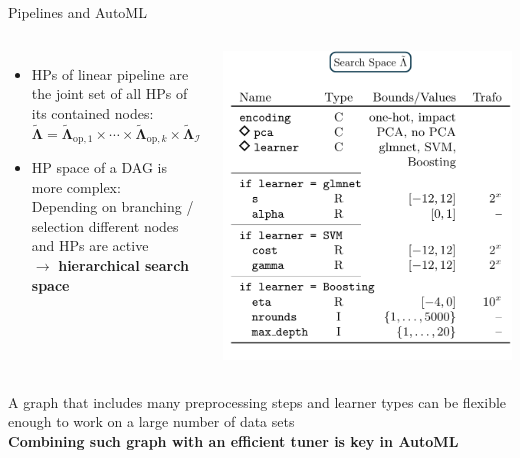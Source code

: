 \begin{vbframe}{Pipelines and AutoML}
\begin{columns}
\begin{itemize}
    \item HPs of linear pipeline are the joint set of all HPs of its contained nodes:\\
    $\tilde{\bm\Lambda}=\tilde{\bm\Lambda}_{\mathrm{op}, 1} \times \cdots \times \tilde{\bm\Lambda}_{\mathrm{op}, k} \times \tilde{\bm\Lambda}_{\mathcal{I}}$
    \item HP space of a DAG is more complex:\\
    Depending on branching / selection different nodes and HPs are active\\ $\rightarrow$ \textbf{hierarchical search space}
\end{itemize}
\begin{center}
\includegraphics[width = \textwidth]{figure_man/pipeline_with_param_table_II.png}
\end{center}
\end{columns}%
\vspace{1em}

A graph that includes many preprocessing steps and learner types can be flexible enough to work on a large number of data sets\\
\vspace{1em}
\textbf{Combining such graph with an efficient tuner is key in AutoML}
\end{vbframe}



